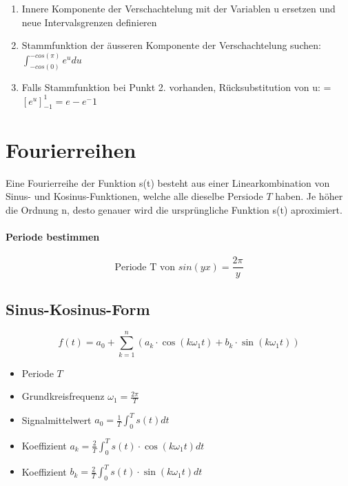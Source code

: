 \begin{enumerate}
	\item Innere Komponente der Verschachtelung mit der Variablen u ersetzen und neue Intervalsgrenzen definieren
	\item Stammfunktion der äusseren Komponente der Verschachtelung suchen: $\int_{-cos(0)}^{-cos(\pi)} e^u du $
	\item Falls Stammfunktion bei Punkt 2. vorhanden, Rücksubstitution von u: = $\left[e^u\right]_{-1}^{1} = e - e^-1$
\end{enumerate}

	
\section{Fourierreihen}
Eine Fourierreihe der Funktion s(t) besteht aus einer Linearkombination
von Sinus- und Kosinus-Funktionen, welche alle dieselbe Persiode $T$
haben. Je höher die Ordnung n, desto genauer wird die ursprüngliche Funktion s(t) aproximiert.

\paragraph{Periode bestimmen}
\[
	\text{Periode T von } sin(yx) = \frac{2\pi}{y}
\]

\subsection{Sinus-Kosinus-Form}
\[
f(t) = a_0 + \sum_{k=1}^{n}
(a_k \cdot \cos(k \omega_1 t) + b_k \cdot \sin(k \omega_1 t))
\]
\begin{itemize}
	\item Periode $T$
	\item Grundkreisfrequenz $\omega_1 = \frac{2\pi}{T}$
	\item Signalmittelwert $a_0 =  \frac{1}{T}\int_0^T s(t) dt$
	\item Koeffizient $a_k = \frac{2}{T} \int_0^T s(t) \cdot \cos(k \omega_1 t) dt$
	\item Koeffizient $b_k = \frac{2}{T} \int_0^T s(t) \cdot \sin(k \omega_1 t) dt$
\end{itemize}

